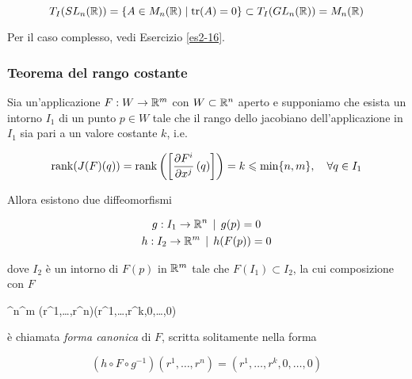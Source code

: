 \begin{equation}
	T_{I}(SL_{n}(\mathbb{R})) = \{ A \in M_{n}(\mathbb{R}) \mid \tr(A)=0 \} \subset T_{I}(GL_{n}(\mathbb{R})) = M_{n}(\mathbb{R})
\end{equation}

Per il caso complesso, vedi Esercizio \ref{es2-16}.

\subsubsection{Teorema del rango costante}

\begin{theorem}
	Sia un'applicazione $ F : W \to \mathbb{R}^{m} $ con $ W \subset \mathbb{R}^{n} $ aperto e supponiamo che esista un intorno $ I_{1} $ di un punto $ p \in W $ tale che il rango dello jacobiano dell'applicazione in $ I_{1} $ sia pari a un valore costante $ k $, i.e.
	
	\begin{equation}
		\rank(J(F)(q)) = \rank \left( \left[ \pdv{F^{i}}{x^{j}} \, (q) \right] \right) = k \leqslant \min\{n,m\} \qcomma \forall q \in I_{1}
	\end{equation}

	Allora esistono due diffeomorfismi
	
	\begin{gather}
		g : I_{1} \to \mathbb{R}^{n} \, \mid \, g(p) = 0 \\
		h : I_{2} \to \mathbb{R}^{m} \, \mid \, h(F(p)) = 0
	\end{gather}
	
	dove $ I_{2} $ è un intorno di $ F(p) $ in $ \mathbb{R}^{m} $ tale che $ F(I_{1}) \subset I_{2} $, la cui composizione con $ F $
	
		{\R^{n}}{\R^{m}}
		{(r^{1},\dots,r^{n})}{(r^{1},\dots,r^{k},0,\dots,0)}

	è chiamata \textit{forma canonica} di $ F $, scritta solitamente nella forma
	
	\begin{equation}
		(h \circ F \circ g^{-1})(r^{1},\dots,r^{n}) = (r^{1},\dots,r^{k},0,\dots,0)
	\end{equation}
	
\end{theorem}


